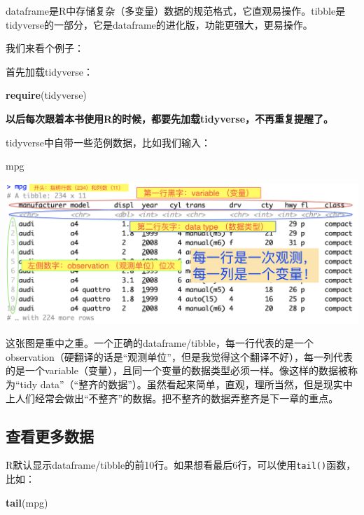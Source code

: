 \documentclass[]{book}
\newenvironment{Shaded}{\begin{snugshade}}{\end{snugshade}}
\newcommand{\KeywordTok}[1]{\textcolor[rgb]{0.13,0.29,0.53}{\textbf{#1}}}
\newcommand{\NormalTok}[1]{#1}
\begin{document}
dataframe是R中存储复杂（多变量）数据的规范格式，它直观易操作。tibble是tidyverse的一部分，它是dataframe的进化版，功能更强大，更易操作。

我们来看个例子：

首先加载tidyverse：

\begin{Shaded}
\begin{Highlighting}[]
\KeywordTok{require}\NormalTok{(tidyverse)}
\end{Highlighting}
\end{Shaded}

\textbf{以后每次跟着本书使用R的时候，都要先加载tidyverse，不再重复提醒了。}

tidyverse中自带一些范例数据，比如我们输入：

\begin{Shaded}
\begin{Highlighting}[]
\NormalTok{mpg}
\end{Highlighting}
\end{Shaded}

\includegraphics[width=1\linewidth]{img/tibble-intro}

这张图是重中之重。一个正确的dataframe/tibble，每一行代表的是一个observation（硬翻译的话是``观测单位''，但是我觉得这个翻译不好），每一列代表的是一个variable（变量），且同一个变量的数据类型必须一样。像这样的数据被称为``tidy data''（``整齐的数据''）。虽然看起来简单，直观，理所当然，但是现实中上人们经常会做出``不整齐''的数据。把不整齐的数据弄整齐是下一章的重点。

\hypertarget{tibble-more-data}{%
\subsection{查看更多数据}\label{tibble-more-data}}

R默认显示dataframe/tibble的前10行。如果想看最后6行，可以使用\texttt{tail()}函数，比如：

\begin{Shaded}
\begin{Highlighting}[]
\KeywordTok{tail}\NormalTok{(mpg)}
\end{Highlighting}
\end{Shaded}
\end{document}
